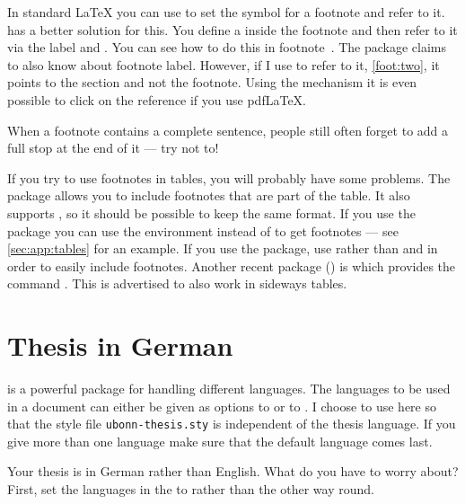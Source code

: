 In standard \LaTeX{} you can use 
to set the symbol for a footnote and refer to it.
\KOMAScript{} has a better solution for this.
You define a  inside the footnote and
then refer to it via the label and .
You can see how to do this in footnote~.
The  package claims to also know about footnote label.
However, if I use  to refer to it, \cref{foot:two},
it points to the section and not the footnote.
Using the  mechanism it is even
possible to click on the reference if you use pdf\LaTeX.

When a footnote contains a complete sentence, people still often
forget to add a full stop at the end of it --- try not to!

If you try to use footnotes in tables, you will probably have some
problems. The  package allows you to include footnotes
that are part of the table. It also supports , so it
should be possible to keep the same format. If you use the package
 you can use the environment  
instead of  to get footnotes
--- see \cref{sec:app:tables} for an example. 
If you use the  package, use 
rather than  and  in order to easily include
footnotes.
Another recent package () is
 which provides the command
. This is advertised to also work in sideways tables.


\section{Thesis in German}%
\label{sec:layout:german}

 is a powerful package for handling different
languages. The languages to be used in a document can either be given
as options to  or to . I choose to
use  here so that the style file
\texttt{ubonn-thesis.sty} is independent of the thesis language. If
you give more than one language make sure that the default language
comes last.

Your thesis is in German rather than English. What do you have to
worry about? First, set the languages in the  to
 rather than the other way round.

